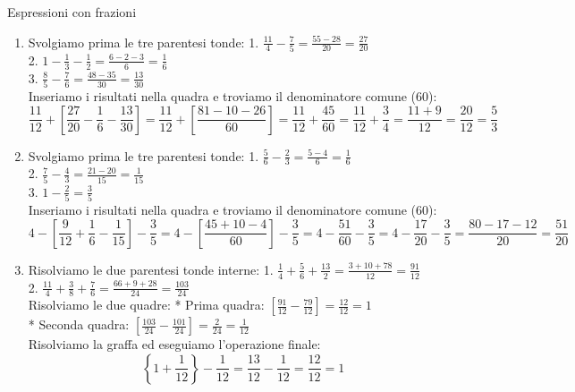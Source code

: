 \begin{esercizio}{Espressioni con frazioni}
\begin{soluzione}
\begin{enumerate}[label=\alph*)]
\[      \]
      Sostituiamo nella parentesi quadra:
      \[
      \left[ \frac{7}{12} + 3 + \frac{1}{2} - \frac{13}{12} \right] = \left[ \frac{7 - 13}{12} + 3 + \frac{1}{2} \right] = \left[ -\frac{6}{12} + 3 + \frac{1}{2} \right] = \left[ -\frac{1}{2} + 3 + \frac{1}{2} \right] = 3
      \]
      Eseguiamo il calcolo finale:
      \[
      \frac{10}{3} + \frac{3}{4} - \frac{13}{12} - 3 = \frac{40 + 9 - 13 - 36}{12} = \frac{49-49}{12} = 0
      \]
    \item Svolgiamo prima le tre parentesi tonde:
      1. $\frac{11}{4} - \frac{7}{5} = \frac{55-28}{20} = \frac{27}{20}$ \\
      2. $1 - \frac{1}{3} - \frac{1}{2} = \frac{6-2-3}{6} = \frac{1}{6}$ \\
      3. $\frac{8}{5} - \frac{7}{6} = \frac{48-35}{30} = \frac{13}{30}$ \\
      Inseriamo i risultati nella quadra e troviamo il denominatore comune (60):
      \[
      \frac{11}{12} + \left[ \frac{27}{20} - \frac{1}{6} - \frac{13}{30} \right] = \frac{11}{12} + \left[ \frac{81-10-26}{60} \right] = \frac{11}{12} + \frac{45}{60} = \frac{11}{12} + \frac{3}{4} = \frac{11+9}{12} = \frac{20}{12} = \frac{5}{3}
      \]
    \item Svolgiamo prima le tre parentesi tonde:
      1. $\frac{5}{6} - \frac{2}{3} = \frac{5-4}{6} = \frac{1}{6}$ \\
      2. $\frac{7}{5} - \frac{4}{3} = \frac{21-20}{15} = \frac{1}{15}$ \\
      3. $1 - \frac{2}{5} = \frac{3}{5}$ \\
      Inseriamo i risultati nella quadra e troviamo il denominatore comune (60):
      \[
      4 - \left[ \frac{9}{12} + \frac{1}{6} - \frac{1}{15} \right] - \frac{3}{5} = 4 - \left[ \frac{45+10-4}{60} \right] - \frac{3}{5} = 4 - \frac{51}{60} - \frac{3}{5} = 4 - \frac{17}{20} - \frac{3}{5} = \frac{80-17-12}{20} = \frac{51}{20}
      \]
    \item Risolviamo le due parentesi tonde interne:
      1. $\frac{1}{4} + \frac{5}{6} + \frac{13}{2} = \frac{3+10+78}{12} = \frac{91}{12}$ \\
      2. $\frac{11}{4} + \frac{3}{8} + \frac{7}{6} = \frac{66+9+28}{24} = \frac{103}{24}$ \\
      Risolviamo le due quadre:
      * Prima quadra: $\left[ \frac{91}{12} - \frac{79}{12} \right] = \frac{12}{12} = 1$ \\
      * Seconda quadra: $\left[ \frac{103}{24} - \frac{101}{24} \right] = \frac{2}{24} = \frac{1}{12}$ \\
      Risolviamo la graffa ed eseguiamo l'operazione finale:
      \[
      \left\{ 1 + \frac{1}{12} \right\} - \frac{1}{12} = \frac{13}{12} - \frac{1}{12} = \frac{12}{12} = 1
      \]
  \end{enumerate}
\end{soluzione}
\end{esercizio}

